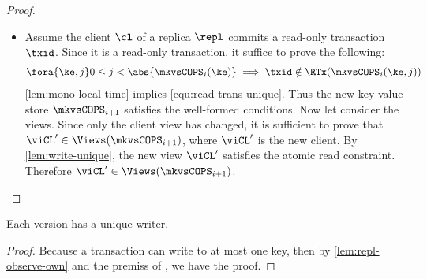 \begin{proof}
\begin{itemize}
\begin{itemize}
            \item {}
                Assume the client \( \cl \) of a replica \( \repl \) commits a read-only transaction \( \txid \).
                Since it is a read-only transaction, it suffice  to prove the following:
                \begin{gather}
                    \fora{\ke,j} 0 \leq j < \abs{ \mkvsCOPS_i(\ke) } \implies \txid \notin \RTx(\mkvsCOPS_{i}(\ke, j)) \label{equ:read-trans-unique} 
                \end{gather}
                \cref{lem:mono-local-time} implies \cref{equ:read-trans-unique}.
                Thus the new key-value store \( \mkvsCOPS_{i+1} \) satisfies the well-formed conditions.
                Now let consider the views.
                Since only the client view has changed, it is sufficient to  prove that \( \viCL' \in \Views(\mkvsCOPS_{i+1}) \), 
                where \( \viCL' \) is the new client.
                By \cref{lem:write-unique}, the new view \( \viCL' \) satisfies the atomic read constraint.
                Therefore \( \viCL' \in \Views(\mkvsCOPS_{i+1})  \).
        \end{itemize}
    \end{itemize}
\end{proof}


\begin{lemma}
    \label{lem:write-unique}
    Each version has a unique writer.
\end{lemma}
\begin{proof}
    Because a transaction can write to at most one key, then by \cref{lem:repl-observe-own} and the premiss of ,
    we have the proof.
\end{proof}

